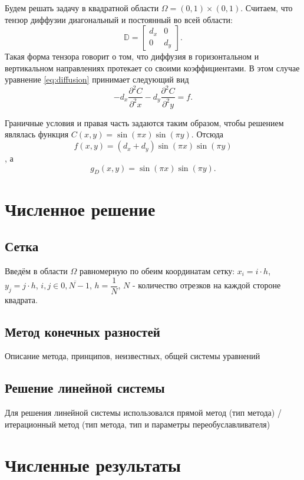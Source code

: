 \documentclass[a4paper, 11pt]{article}
\begin{document}
Будем решать задачу в квадратной области $\Omega = (0, 1) \times (0, 1)$.
Считаем, что тензор диффузии диагональный и постоянный во всей области:
\begin{equation}
\mathbb{D} = \begin{bmatrix} d_x & 0 \\ 0 & d_y \end{bmatrix}.
\end{equation}
Такая форма тензора говорит о том, что диффузия в горизонтальном и вертикальном направлениях протекает со своими коэффициентами. В этом случае уравнение \eqref{eq:diffusion} принимает следующий вид
\begin{equation}
- d_x \dfrac{\partial^2 C}{\partial^2 x} - d_y \dfrac{\partial^2 C}{\partial^2 y} = f.
\end{equation}


Граничные условия и правая часть задаются таким образом, чтобы решением являлась функция 
$C(x, y) = \sin(\pi x) \sin(\pi y)$. Отсюда
$$f(x, y) = (d_x + d_y) \sin(\pi x) \sin(\pi y)$$, а
$$g_D(x, y) = \sin(\pi x) \sin(\pi y).
$$


\section{Численное решение}

\subsection{Сетка}
Введём в области $\Omega$ равномерную по обеим координатам сетку: 
$x_i = i \cdot h$, $y_j = j \cdot h$, $i, j \in \overline{0, N - 1}$, $h = \dfrac{1}{N}$, $N$ 
- количество отрезков на каждой стороне квадрата.

\subsection{Метод конечных разностей}

Описание метода, принципов, неизвестных, общей системы уравнений

\subsection{Решение линейной системы}
Для решения линейной системы использовался прямой метод (тип метода) / итерационный метод (тип метода, тип и параметры переобуславливателя)

\section{Численные результаты}
\end{document}
